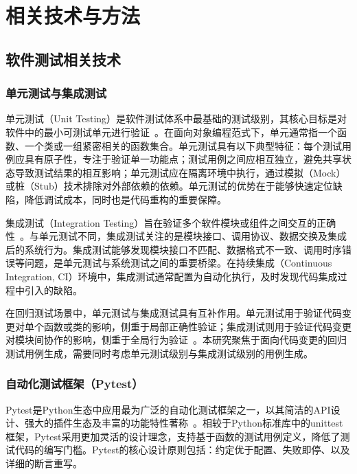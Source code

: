 
\chapter{相关技术与方法}
\section{软件测试相关技术}
\subsection{单元测试与集成测试}
单元测试（Unit Testing）是软件测试体系中最基础的测试级别，其核心目标是对软件中的最小可测试单元进行验证~\cite{Myers2011}。在面向对象编程范式下，单元通常指一个函数、一个类或一组紧密相关的函数集合。单元测试具有以下典型特征：每个测试用例应具有原子性，专注于验证单一功能点；测试用例之间应相互独立，避免共享状态导致测试结果的相互影响；单元测试应在隔离环境中执行，通过模拟（Mock）或桩（Stub）技术排除对外部依赖的依赖。单元测试的优势在于能够快速定位缺陷，降低调试成本，同时也是代码重构的重要保障。

集成测试（Integration Testing）旨在验证多个软件模块或组件之间交互的正确性~\cite{Myers2011}。与单元测试不同，集成测试关注的是模块接口、调用协议、数据交换及集成后的系统行为。集成测试能够发现模块接口不匹配、数据格式不一致、调用时序错误等问题，是单元测试与系统测试之间的重要桥梁。在持续集成（Continuous Integration, CI）环境中，集成测试通常配置为自动化执行，及时发现代码集成过程中引入的缺陷。

在回归测试场景中，单元测试与集成测试具有互补作用。单元测试用于验证代码变更对单个函数或类的影响，侧重于局部正确性验证；集成测试则用于验证代码变更对模块间协作的影响，侧重于全局行为验证~\cite{YooHarman2012}。本研究聚焦于面向代码变更的回归测试用例生成，需要同时考虑单元测试级别与集成测试级别的用例生成。

\subsection{自动化测试框架（Pytest）}
Pytest是Python生态中应用最为广泛的自动化测试框架之一，以其简洁的API设计、强大的插件生态及丰富的功能特性著称~\cite{pytestOfficial}。相较于Python标准库中的unittest框架，Pytest采用更加灵活的设计理念，支持基于函数的测试用例定义，降低了测试代码的编写门槛。Pytest的核心设计原则包括：约定优于配置、失败即停、以及详细的断言重写。

